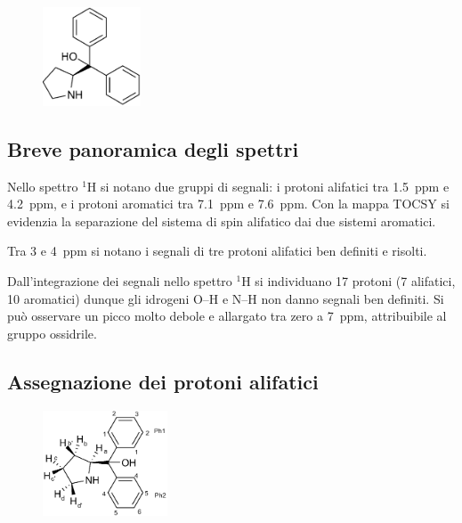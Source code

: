 \documentclass[a4paper, italian, oneside, 12pt]{article}
\begin{document}
\begin{figure}\vspace{-20pt}
  \begin{center}
    \includegraphics[width=0.26\textwidth]{img/A1.png}
  \end{center}\vspace{-20pt}
\end{figure}

\subsection{Breve panoramica degli spettri}

Nello spettro $^1$H si notano due gruppi di segnali: i protoni alifatici tra 1.5~ppm e 4.2~ppm, e i protoni aromatici tra 7.1~ppm e 7.6~ppm. Con la mappa TOCSY si evidenzia la separazione del sistema di spin alifatico dai due sistemi aromatici.

Tra 3 e 4~ppm si notano i segnali di tre protoni alifatici ben definiti e risolti.

Dall'integrazione dei segnali nello spettro $^1$H si individuano 17 protoni (7 alifatici, 10 aromatici) dunque gli idrogeni O--H e N--H non danno segnali ben definiti. Si può osservare un picco molto debole e allargato tra zero a 7~ppm, attribuibile al gruppo ossidrile.

\subsection{Assegnazione dei protoni alifatici}
\begin{figure}\vspace{-20pt}
  \begin{center}
    \includegraphics[width=0.33\textwidth]{img/A2.png}
  \end{center}\vspace{-20pt}
\end{figure}
\end{document}
